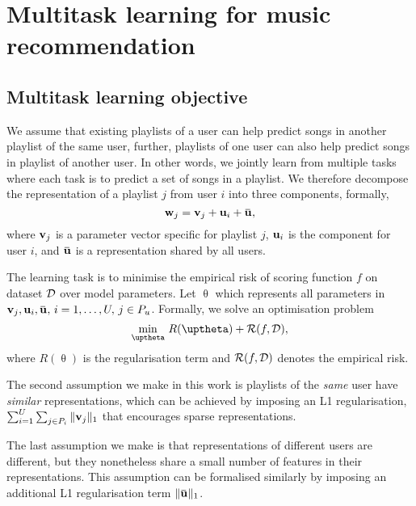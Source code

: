 \section{Multitask learning for music recommendation}
\label{sec:method}

\subsection{Multitask learning objective}

We assume that existing playlists of a user can help predict songs in another playlist of the same user,
further, playlists of one user can also help predict songs in playlist of another user.
In other words, we jointly learn from multiple tasks where each task is to predict a set of songs in a playlist.
We therefore decompose the representation of a playlist $j$ from user $i$ into three components, formally,
$$
\w_j = \bv_j + \bu_i + \widebar\bu,
$$
where $\mathbf{v}_j$ is a parameter vector specific for playlist $j$,
$\mathbf{u}_i$ is the component for user $i$,
and $\widebar\bu$ is a representation shared by all users.


The learning task is to minimise the empirical risk of scoring function $f$ on dataset $\mathcal{D}$ over model parameters.
Let $\uptheta$ which represents all parameters in $\bv_j, \bu_i, \widebar\bu, \, i=1,\dots,U, \, j \in P_u$.
Formally, we solve an optimisation problem
\begin{equation}
\label{eq:obj}
\min_{\uptheta} \, R(\uptheta) + \RCal(f, \DCal),
\end{equation}
where $R(\uptheta)$ is the regularisation term and $\mathcal{R}(f, \mathcal{D})$ denotes the empirical risk.

The second assumption we make in this work is playlists of the \emph{same} user have \emph{similar} representations,
which can be achieved by imposing an L1 regularisation, \ie $\sum_{i=1}^U \sum_{j \in P_i} \| \mathbf{v}_j \|_1$
that encourages sparse representations.

The last assumption we make is that representations of different users are different,
but they nonetheless share a small number of features in their representations.
This assumption can be formalised similarly by imposing an additional L1 regularisation term $\| \widebar\bu \|_1$.

